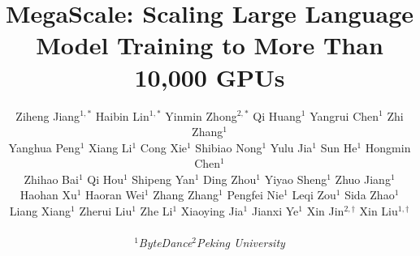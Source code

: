 \documentclass[letterpaper,twocolumn,10pt]{article}
\begin{document}
\sloppy
\date{}


\title{MegaScale: Scaling Large Language Model Training to More Than 10,000 GPUs}

\author{
\vspace{-0.1in}
\rm{
    Ziheng Jiang$^{\text{1}, *}$ \enskip
    Haibin Lin$^{\text{1}, *}$ \enskip
    Yinmin Zhong$^{\text{2}, *}$ \enskip
    Qi Huang$^{\text{1}}$ \enskip
    Yangrui Chen$^{\text{1}}$ \enskip
    Zhi Zhang$^{\text{1}}$ \enskip\\
}
\vspace{-0.1in}
\rm{
    Yanghua Peng$^{\text{1}}$ \enskip
    Xiang Li$^{\text{1}}$ \enskip
    Cong Xie$^{\text{1}}$ \enskip
    Shibiao Nong$^{\text{1}}$ \enskip
    Yulu Jia$^{\text{1}}$ \enskip
    Sun He$^{\text{1}}$ \enskip
    Hongmin Chen$^{\text{1}}$ \enskip\\
}
\vspace{-0.1in}
\rm{
    Zhihao Bai$^{\text{1}}$ \enskip
    Qi Hou$^{\text{1}}$ \enskip
    Shipeng Yan$^{\text{1}}$ \enskip
    Ding Zhou$^{\text{1}}$ \enskip
    Yiyao Sheng$^{\text{1}}$ \enskip
    Zhuo Jiang$^{\text{1}}$ \enskip\\
}
\vspace{-0.1in}
\rm{
    Haohan Xu$^{\text{1}}$ \enskip
    Haoran Wei$^{\text{1}}$ \enskip
    Zhang Zhang$^{\text{1}}$ \enskip
    Pengfei Nie$^{\text{1}}$ \enskip
    Leqi Zou$^{\text{1}}$ \enskip
    Sida Zhao$^{\text{1}}$ \enskip\\
}
\vspace{-0.1in}
\rm{
    Liang Xiang$^{\text{1}}$ \enskip
    Zherui Liu$^{\text{1}}$ \enskip
    Zhe Li$^{\text{1}}$ \enskip
    Xiaoying Jia$^{\text{1}}$ \enskip
    Jianxi Ye$^{\text{1}}$ \enskip
    Xin Jin$^{\text{2}, \dag}$ \enskip
    Xin Liu$^{\text{1}, \dag}$ \enskip\\
}

{$^{\text{1}}$\textit{ByteDance}\enskip $^{\text{2}}$\textit{Peking University}\enskip}
}

\maketitle
\pagestyle{plain}
\captionsetup[figure]{font=small}
\captionsetup[table]{font=small}
\end{document}
